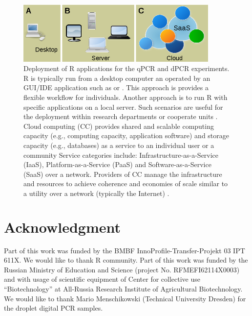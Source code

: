 \begin{figure}[htbp]
  \centering
  \includegraphics[clip=true, width=10cm]{figures/options.png}
  \caption{Deployment of R applications for the qPCR and dPCR experiments. 
 R is typically run from a desktop computer an operated by an 
GUI/IDE application such as  or . This approach is 
provides a flexible workflow for individuals.  Another approach is 
to run R with specific applications on a local server. Such scenarios are useful 
for the deployment within research departments or cooperate units \citep{R_web}. 
 Cloud computing (CC) provides shared and scalable computing 
capacity (e.g., computing capacity, application software) and storage capacity 
(e.g., databases) as a service to an individual user or a community Service 
categories include: Infrastructure-as-a-Service (IaaS), Platform-as-a-Service 
(PaaS) and Software-as-a-Service (SaaS) over a network. Providers of CC manage 
the infrastructure and resources to achieve coherence and economies of scale 
similar to a utility over a network (typically the Internet) \citep{R_cloud}.}
  \label{figure:options}
\end{figure} 

\section{Acknowledgment}

Part of this work was funded by the BMBF InnoProfile-Transfer-Projekt 03 IPT 
611X. We would like to thank R community. Part of this work was funded by the 
Russian Ministry of Education and Science (project No. RFMEFI62114X0003) and 
with usage of scientific equipment of Center for collective use 
``Biotechnology'' at All-Russia Research Institute of Agricultural 
Biotechnology. We would like to thank Mario Menschikowski (Technical University 
Dresden) for the droplet digital PCR samples.



\address{Stefan R\"odiger (corresponding author)\\
  Faculty of Natural Sciences\\
  Brandenburg University of Technology Cottbus--Senftenberg\\
  Senftenberg\\
  Germany}

